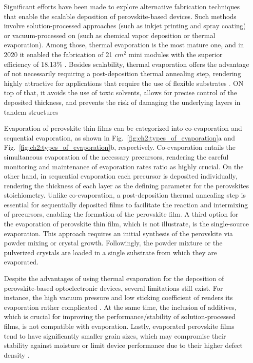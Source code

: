 Significant efforts have been made to explore alternative fabrication techniques that enable the scalable deposition of perovskite-based devices. Such methods involve solution-processed approaches (such as inkjet printing and spray coating) or vacuum-processed on (such as chemical vapor deposition or thermal evaporation). Among those, thermal evaporation is the most mature one, and in 2020 it enabled the fabrication of 21 $cm^2$ mini modules with the superior efficiency of 18.13\% \cite{Vaynzof2020TheProcessing, Li2020HighlyMini-modules}. Besides scalability, thermal evaporation offers the advantage of not necessarily requiring a post-deposition thermal annealing step, rendering highly attractive for applications that require the use of flexible substrates \cite{Becker2019LowExperimentation}. ON top of that, it avoids the use of toxic solvents, allows for precise control of the deposited thickness, and prevents the risk of damaging the underlying layers in tandem structures \cite{Zhang2020TowardCells, Forgacs2017EfficientCells}

Evaporation of perovskite thin films can be categorized into co-evaporation and sequential evaporation, as shown in Fig.~\ref{fig:ch2:types_of_evaporation}a and Fig.~\ref{fig:ch2:types_of_evaporation}b, respectively. Co-evaporation entails the simultaneous evaporation of the necessary precursors, rendering the careful monitoring and maintenance of evaporation rates ratio as highly crucial. On the other hand, in sequential evaporation each precursor is deposited individually, rendering the thickness of each layer as the defining parameter for the perovskites stoichiometry. Unlike co-evaporation, a post-deposition thermal annealing step is essential for sequentially deposited films to facilitate the reaction and intermixing of precursors, enabling the formation of the perovskite film. A third option for the evaporation of perovskite thin film, which is not illustrate, is the single-source evaporation. This approach requires an initial synthesis of the perovskite via powder mixing or crystal growth. Followingly, the powder mixture or the pulverized crystals are loaded in a single substrate from which they are evaporated. 


Despite the advantages of using thermal evaporation for the deposition of perovskite-based optoelectronic devices, several limitations still exist. For instance, the high vacuum pressure and low sticking coefficient of  renders its evaporation rather complicated \cite{Kim2020DepositionPerovskite}. At the same time, the inclusion of additives, which is crucial for improving the performance/stability of solution-processed films, is not compatible with evaporation. Lastly, evaporated perovskite films tend to have significantly smaller grain sizes, which may compromise their stability against moisture or limit device performance due to their higher defect density \cite{Vaynzof2020TheProcessing, Wang2017ScalingFilms}.


